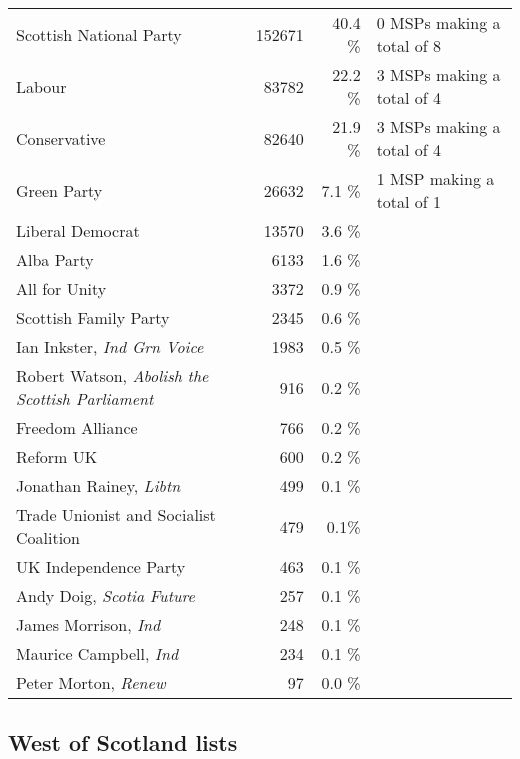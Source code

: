 \noindent
\begin{tabular*}{\textwidth}{@{\extracolsep{\fill}} p{}<{\dotfill} r r<{\%} p{} @{\extracolsep{\fill}}}
	Scottish National Party & 152671 & 40.4 & 0 MSPs making a total of 8\\
	Labour & 83782 & 22.2 & 3 MSPs making a total of 4\\
	Conservative & 82640 & 21.9 & 3 MSPs making a total of 4\\
	Green Party & 26632 & 7.1 & 1 MSP making a total of 1\\
	Liberal Democrat & 13570 & 3.6 & \\
	Alba Party & 6133 & 1.6 & \\
	All for Unity & 3372 & 0.9 & \\
	Scottish Family Party & 2345 & 0.6 & \\
	Ian Inkster, \emph{Ind Grn Voice} & 1983 & 0.5 & \\
	Robert Watson, \emph{Abolish the Scottish Parliament} & 916 & 0.2 & \\
	Freedom Alliance & 766 & 0.2 & \\
	Reform UK & 600 & 0.2 & \\
	Jonathan Rainey, \emph{Libtn} & 499 & 0.1 & \\
	Trade Unionist and Socialist Coalition & 479 &  0.1& \\
	UK Independence Party & 463 & 0.1 & \\
	Andy Doig, \emph{Scotia Future} & 257 & 0.1 & \\
	James Morrison, \emph{Ind} & 248 & 0.1 & \\
	Maurice Campbell, \emph{Ind} & 234 & 0.1 & \\
	Peter Morton, \emph{Renew} & 97 & 0.0 & \\
\end{tabular*}

\subsection*{West of Scotland lists}

